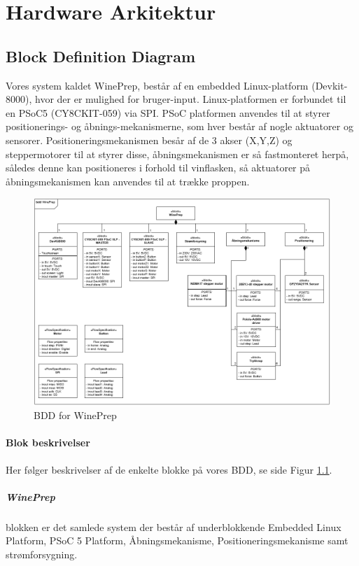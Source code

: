 \chapter{Hardware Arkitektur}

\section{Block Definition Diagram}
Vores system kaldet WinePrep, består af en embedded Linux-platform (Devkit-8000), hvor der er mulighed for bruger-input. Linux-platformen er forbundet til en PSoC5 (CY8CKIT-059) via SPI. PSoC platformen anvendes til at styrer positionerings- og åbnings-mekanismerne, som hver består af nogle aktuatorer og sensorer. Positioneringsmekanismen besår af de 3 akser (X,Y,Z) og steppermotorer til at styrer disse, åbningsmekanismen er så fastmonteret herpå, således denne kan positioneres i forhold til vinflasken, så aktuatorer på åbningsmekanismen kan anvendes til at trække proppen.

\begin{figure}[H]
	\centering
	\includegraphics[scale=0.4]{BDD_Win}
	\caption{BDD for WinePrep}
	\label{BDD}
\end{figure}

\subsubsection{Blok beskrivelser}
Her følger beskrivelser af de enkelte blokke på vores BDD, se side \pageref{BDD} Figur \ref{BDD}.

\paragraph{WinePrep} blokken er det samlede system der består af underblokkende Embedded Linux Platform, PSoC 5 Platform, Åbningsmekanisme, Positioneringsmekanisme samt strømforsygning.

